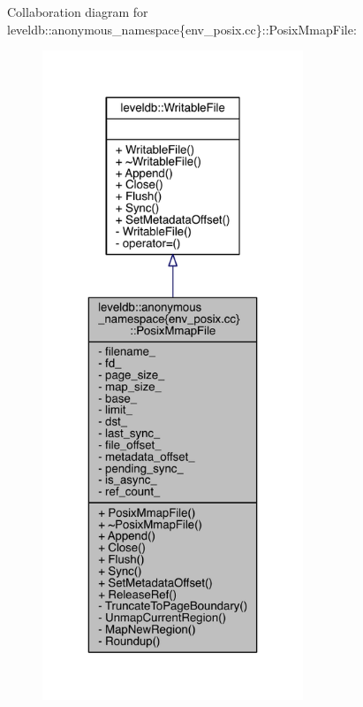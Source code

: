 Collaboration diagram for leveldb\+:\+:anonymous\+\_\+namespace\{env\+\_\+posix.\+cc\}\+:\+:Posix\+Mmap\+File\+:
\nopagebreak
\begin{figure}[H]
\begin{center}
\leavevmode
\includegraphics[height=550pt]{classleveldb_1_1anonymous__namespace_02env__posix_8cc_03_1_1_posix_mmap_file__coll__graph}
\end{center}
\end{figure}
